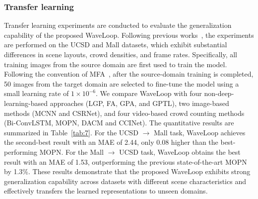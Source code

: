 \documentclass[lettersize,journal]{IEEEtran}
\begin{document}
\subsubsection{Transfer learning}
Transfer learning experiments are conducted to evaluate the generalization capability of the proposed WaveLoop. Following previous works~\cite{xiong2017spatiotemporal,ling2023motional,ling2025dual}, the experiments are performed on the UCSD and Mall datasets, which exhibit substantial differences in scene layouts, crowd densities, and frame rates. Specifically, all training images from the source domain are first used to train the model. Following the convention of MFA~\cite{ling2023motional}, after the source-domain training is completed, 50 images from the target domain are selected to fine-tune the model using a small learning rate of $1\times10^{-6}$. We compare WaveLoop with four non-deep-learning-based approaches (LGP, FA, GPA, and GPTL), two image-based methods (MCNN and CSRNet), and four video-based crowd counting methods (Bi-ConvLSTM, MOPN, DACM and CCINet). The quantitative results are summarized in Table~\ref{tab:7}. For the UCSD $\rightarrow$ Mall task, WaveLoop achieves the second-best result with an MAE of 2.44, only 0.08 higher than the best-performing MOPN\cite{hossain2020video}. For the Mall $\rightarrow$ UCSD task, WaveLoop obtains the best result with an MAE of 1.53, outperforming the previous state-of-the-art MOPN by 1.3\%. These results demonstrate that the proposed WaveLoop exhibits strong generalization capability across datasets with different scene characteristics and effectively transfers the learned representations to unseen domains.
\end{document}
